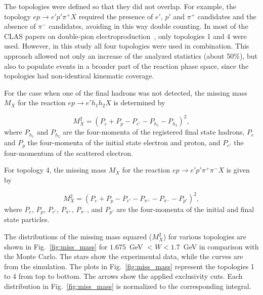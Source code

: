 \documentclass[prc,twocolumn,superscriptaddress,showpacs,amssymb,amsmath,amsfonts,aps,nofootinbib]{revtex4-1}
\begin{document}
The topologies were defined so that they did not overlap. For example, the topology $e p \rightarrow e' p' \pi^{+} X$ required the presence of $e'$, $p'$ and $\pi^{+}$ candidates and the absence of $\pi^{-}$ candidates, avoiding in this way double counting. In most of the CLAS papers on double-pion electroproduction~\cite{Isupov:2017lnd,Ripani:2002ss,Fedotov:2008aa}, only topologies 1 and 4 were used. However, in this study all four topologies were used in combination. 
This approach allowed not only an increase of the analyzed statistics (about 50\%), but also to populate events in a broader part of the reaction phase space, since the topologies had non-identical kinematic coverage. 








For the case when one of the final hadrons was not detected, the missing mass $M_{X}$ for the reaction $e p \rightarrow e' h_1 h_2 X$ is determined by 



\begin{equation}
M_{X}^{2} = (P_{e} + P_{p} -P_{e'} - P_{h_1} - P_{h_2})^{2},
\label{eg:miss_mass}
\end{equation} 
where $P_{h_1}$ and $P_{h_2}$ are the four-momenta of the registered final state hadrons, $P_{e}$ and $P_{p}$ the four-momenta of the initial state electron and proton, and $P_{e'}$ the four-momentum of the scattered electron.

For topology 4, the missing mass $M_{X}$ for the reaction $e p \rightarrow e' p' \pi^+ \pi^- X$ is given by

\begin{equation}
M_{X}^{2} = (P_{e} + P_{p} -P_{e'} - P_{\pi^+} - P_{\pi^-} - P_{p'})^{2},
\label{eg:miss_mass_zero}
\end{equation} 
where $P_{e}$, $P_{p}$, $P_{e'}$, $P_{\pi^+}$, $P_{\pi^-}$,  and $P_{p'}$  are the four-momenta of the initial and final state particles.

 


The distributions of the missing mass squared ($M_{X}^{2}$) for various topologies are shown in Fig.~\ref{fig:miss_mass} for $1.675$~GeV $< W < 1.7$~GeV in comparison with the Monte Carlo. The stars show the experimental data, while the curves are from the simulation.
The plots in Fig.~\ref{fig:miss_mass} represent the topologies 1 to 4 from top to bottom. The arrows show the applied exclusivity cuts. 
Each distribution in Fig.~\ref{fig:miss_mass} is normalized to the corresponding integral.
\end{document}
